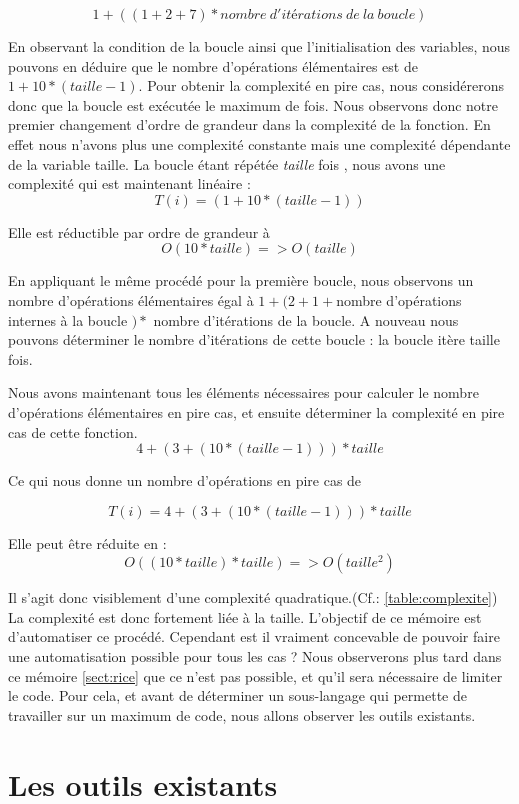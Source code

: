 \documentclass[12pt, twoside, openright]{report}
\begin{document}
\begin{center}
    \[1 + ((1 + 2 + 7) * nombre\ d'itérations\ de\ la\ boucle )\]
\end{center}

En observant la condition de la boucle ainsi que l'initialisation des variables, nous pouvons en déduire que le nombre d'opérations élémentaires est de $ 1 + 10 * (taille - 1)$. Pour obtenir la complexité en pire cas, nous considérerons donc que la boucle est exécutée le maximum de fois. Nous observons donc notre premier changement d'ordre de grandeur dans la complexité de la fonction. En effet nous n'avons plus une complexité constante mais une complexité dépendante de la variable taille. La boucle étant répétée \textit{taille} fois , nous avons une complexité qui est maintenant linéaire : \[T(i) = (1 + 10 * (taille-1))\] 

Elle est réductible par ordre de grandeur à \[O(10*taille) => O(taille)\]

En appliquant le même procédé pour la première boucle, nous observons un nombre d'opérations élémentaires égal à $1 + (2 + 1 + $nombre d'opérations internes à la boucle $) *$ nombre d'itérations de la boucle. A nouveau nous pouvons déterminer le nombre d'itérations de cette boucle : la boucle itère taille fois. 

Nous avons maintenant tous les éléments nécessaires pour calculer le nombre d'opérations élémentaires en pire cas, et ensuite déterminer la complexité en pire cas de cette fonction. 
$$ 4 + ( 3 + (10 * (taille - 1))) * taille$$

Ce qui nous donne un nombre d'opérations en pire cas de 

\[T(i) = 4 + (3 + (10 * (taille - 1))) * taille\] 

Elle peut être réduite en : \[O((10*taille) * taille) => O(taille^{2})\] 

 Il s'agit donc visiblement d'une complexité quadratique.(Cf.: \ref{table:complexite}) La complexité est donc fortement liée à la taille. L'objectif de ce mémoire est d'automatiser ce procédé. Cependant est il vraiment concevable de pouvoir faire une automatisation possible pour tous les cas ? Nous observerons plus tard dans ce mémoire \ref{sect:rice} que ce n'est pas possible, et qu'il sera nécessaire de limiter le code. Pour cela, et avant de déterminer un sous-langage qui permette de travailler sur un maximum de code, nous allons observer les outils existants. 


\chapter{Les outils existants}
\end{document}
